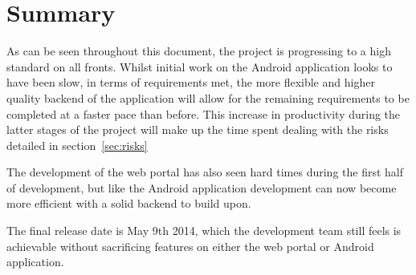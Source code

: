 \documentclass[11pt,a4paper]{article}
\begin{document}
\section{Summary}
As can be seen throughout this document, the project is progressing to a high standard on all fronts. Whilst initial work on the Android application looks to have been slow, in terms of requirements met, the more flexible and higher quality backend of the application will allow for the remaining requirements to be completed at a faster pace than before. This increase in productivity during the latter stages of the project will make up the time spent dealing with the risks detailed in section~\ref{sec:risks}

The development of the web portal has also seen hard times during the first half of development, but like the Android application development can now become more efficient with a solid backend to build upon.

The final release date is May 9th 2014, which the development team still feels is achievable without sacrificing features on either the web portal or Android application.

\newpage


\end{document}
